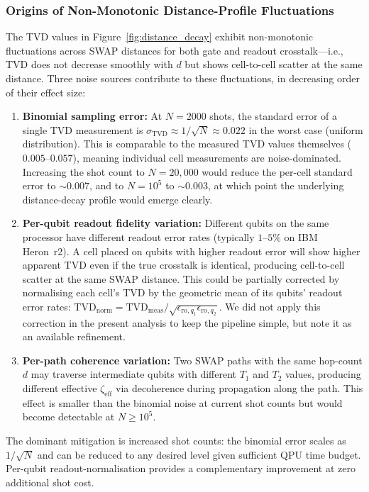 \documentclass[ASNA,twocolumn]{USG}
\begin{document}
\subsubsection*{Origins of Non-Monotonic Distance-Profile Fluctuations}

The TVD values in Figure~\ref{fig:distance_decay} exhibit non-monotonic fluctuations across SWAP distances for both gate and readout crosstalk---i.e., TVD does not decrease smoothly with $d$ but shows cell-to-cell scatter at the same distance. Three noise sources contribute to these fluctuations, in decreasing order of their effect size:

\begin{enumerate}
    \item \textbf{Binomial sampling error:} At $N = 2000$ shots, the standard error of a single TVD measurement is $\sigma_{\mathrm{TVD}} \approx 1/\sqrt{N} \approx 0.022$ in the worst case (uniform distribution). This is comparable to the measured TVD values themselves ($0.005$--$0.057$), meaning individual cell measurements are noise-dominated. Increasing the shot count to $N = 20{,}000$ would reduce the per-cell standard error to $\sim 0.007$, and to $N = 10^5$ to $\sim 0.003$, at which point the underlying distance-decay profile would emerge clearly.
    \item \textbf{Per-qubit readout fidelity variation:} Different qubits on the same processor have different readout error rates (typically $1$--$5\%$ on IBM Heron~r2). A cell placed on qubits with higher readout error will show higher apparent TVD even if the true crosstalk is identical, producing cell-to-cell scatter at the same SWAP distance. This could be partially corrected by normalising each cell's TVD by the geometric mean of its qubits' readout error rates: $\mathrm{TVD}_{\mathrm{norm}} = \mathrm{TVD}_{\mathrm{meas}} / \sqrt{\epsilon_{\mathrm{ro},q_1} \epsilon_{\mathrm{ro},q_2}}$. We did not apply this correction in the present analysis to keep the pipeline simple, but note it as an available refinement.
    \item \textbf{Per-path coherence variation:} Two SWAP paths with the same hop-count $d$ may traverse intermediate qubits with different $T_1$ and $T_2$ values, producing different effective $\zeta_{\mathrm{eff}}$ via decoherence during propagation along the path. This effect is smaller than the binomial noise at current shot counts but would become detectable at $N \geq 10^5$.
\end{enumerate}

The dominant mitigation is increased shot counts: the binomial error scales as $1/\sqrt{N}$ and can be reduced to any desired level given sufficient QPU time budget. Per-qubit readout-normalisation provides a complementary improvement at zero additional shot cost.
\end{document}
